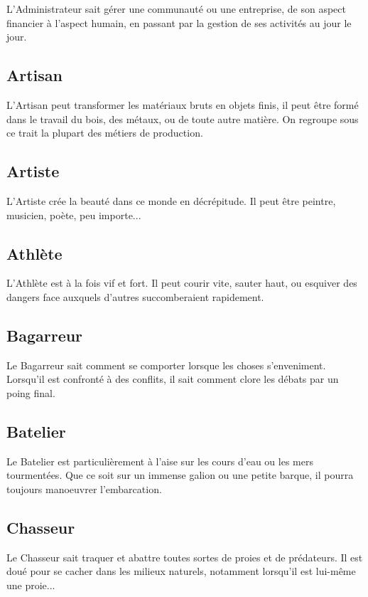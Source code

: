 L'Administrateur sait gérer une communauté ou une entreprise, de son aspect financier à l'aspect humain, en passant par la gestion de ses activités au jour le jour.

\subsection*{Artisan}

L'Artisan peut transformer les matériaux bruts en objets finis, il peut être formé dans le travail du bois, des métaux, ou de toute autre matière. On regroupe sous ce trait la plupart des métiers de production.

\subsection*{Artiste}

L'Artiste crée la beauté dans ce monde en décrépitude. Il peut être peintre, musicien, poète, peu importe...

\subsection*{Athlète}

L'Athlète est à la fois vif et fort. Il peut courir vite, sauter haut, ou esquiver des dangers face auxquels d'autres succomberaient rapidement.

\subsection*{Bagarreur}

Le Bagarreur sait comment se comporter lorsque les choses s'enveniment. Lorsqu'il est confronté à des conflits, il sait comment clore les débats par un poing final.

\subsection*{Batelier}

Le Batelier est particulièrement à l'aise sur les cours d'eau ou les mers tourmentées. Que ce soit sur un immense galion ou une petite barque, il pourra toujours manoeuvrer l'embarcation.

\subsection*{Chasseur}

Le Chasseur sait traquer et abattre toutes sortes de proies et de prédateurs. Il est doué pour se cacher dans les milieux naturels, notamment lorsqu'il est lui-même une proie...


